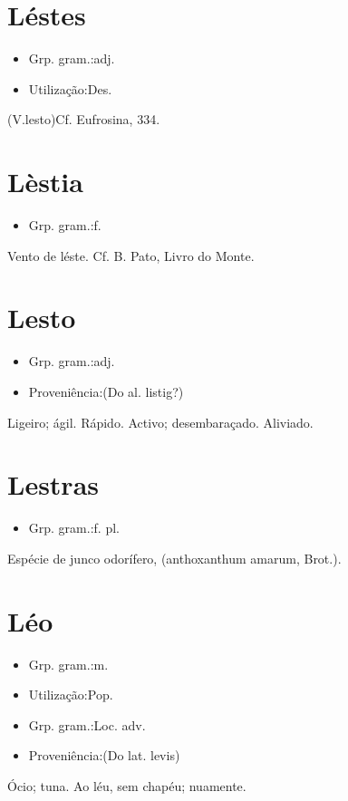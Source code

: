 \section{Léstes}
\begin{itemize}
\item {Grp. gram.:adj.}
\end{itemize}
\begin{itemize}
\item {Utilização:Des.}
\end{itemize}
(V.lesto)Cf. \textunderscore Eufrosina\textunderscore , 334.
\section{Lèstia}
\begin{itemize}
\item {Grp. gram.:f.}
\end{itemize}
Vento de léste. Cf. B. Pato, \textunderscore Livro do Monte\textunderscore .
\section{Lesto}
\begin{itemize}
\item {Grp. gram.:adj.}
\end{itemize}
\begin{itemize}
\item {Proveniência:(Do al. \textunderscore listig\textunderscore ?)}
\end{itemize}
Ligeiro; ágil.
Rápido.
Activo; desembaraçado.
Aliviado.
\section{Lestras}
\begin{itemize}
\item {Grp. gram.:f. pl.}
\end{itemize}
Espécie de junco odorífero, (\textunderscore anthoxanthum amarum\textunderscore , Brot.).
\section{Léo}
\begin{itemize}
\item {Grp. gram.:m.}
\end{itemize}
\begin{itemize}
\item {Utilização:Pop.}
\end{itemize}
\begin{itemize}
\item {Grp. gram.:Loc. adv.}
\end{itemize}
\begin{itemize}
\item {Proveniência:(Do lat. \textunderscore levis\textunderscore )}
\end{itemize}
Ócio; tuna.
\textunderscore Ao léu\textunderscore , sem chapéu; nuamente.
